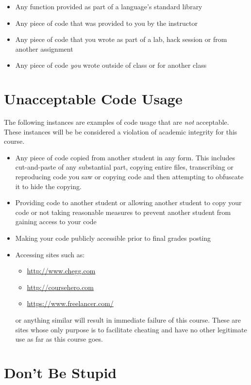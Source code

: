 \documentclass[12pt]{scrartcl}
\begin{document}
\begin{itemize}
  \item Any function provided as part of a language's standard library
  \item Any piece of code that was provided to you by the instructor
  \item Any piece of code that you wrote as part of a lab, hack session or from another assignment
  \item Any piece of code \emph{you} wrote outside of class or for another class
\end{itemize}

\section*{Unacceptable Code Usage}

The following instances are examples of code usage that are \emph{not}
acceptable.  These instances will be be considered a violation of academic
integrity for this course.

\begin{itemize}
  \item Any piece of code copied from another student in any form.  This
  includes cut-and-paste of any substantial part, copying entire files,
  transcribing or reproducing code you saw or copying code and then attempting
  to obfuscate it to hide the copying.
  \item Providing code to another student or allowing another student to copy your code or not taking reasonable measures to prevent another student from gaining access to your code
  \item Making your code publicly accessible prior to final grades posting
  \item Accessing sites such as:
  \begin{itemize}
    \item \url{http://www.chegg.com}
    \item \url{http://coursehero.com}
    \item \url{https://www.freelancer.com/}
  \end{itemize}
  or anything similar will result in immediate failure of this course.  These
  are sites whose only purpose is to facilitate cheating and have no other
  legitimate use as far as this course goes.
\end{itemize}

\section*{Don't Be Stupid}
\end{document}
